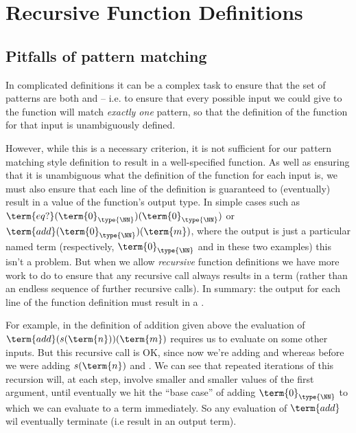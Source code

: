 \newpage





\section{Recursive Function Definitions}
\subsection{Pitfalls of pattern matching}
\label{sec:NaturalNumbers-PitfallsPatternMatching}

In complicated definitions it can be a complex task to ensure that the set of patterns are both  and  -- i.e. to ensure that every possible input we could give to the function will match \emph{exactly one} pattern, so that the definition of the function for that input is unambiguously defined.

However, while this is a necessary criterion, it is not sufficient for our pattern matching style definition to result in a well-specified function.  As well as ensuring that it is unambiguous what the definition of the function for each input is, we must also ensure that each line of the definition is guaranteed to (eventually) result in a value of the function's output type.  In simple cases such as $\term{eq?}(\term{0}_{\type{\NN}})(\term{0}_{\type{\NN}})$ or $\term{add}(\term{0}_{\type{\NN}})(\term{m})$, where the output is just a particular named term (respectively, $\term{0}_{\type{\NN}}$ and  in these two examples) this isn't a problem.  But when we allow \emph{recursive} function definitions we have more work to do to ensure that any recursive call always results in a term (rather than an endless sequence of further recursive calls).  In summary: the output for each line of the function definition must result in a .

For example, in the definition of addition given above the evaluation of $\term{add}(s(\term{n}))(\term{m})$ requires us to evaluate  on some other inputs.
But this recursive call is OK, since now we're adding  and  whereas before we were adding $s(\term{n})$ and .  We can see that repeated iterations of this recursion will, at each step, involve smaller and smaller values of the first argument, until eventually we hit the ``base case'' of adding $\term{0}_{\type{\NN}}$ to  which we can evaluate to a term immediately.  So any evaluation of $\term{add}$ wil eventually terminate (i.e result in an output term).

